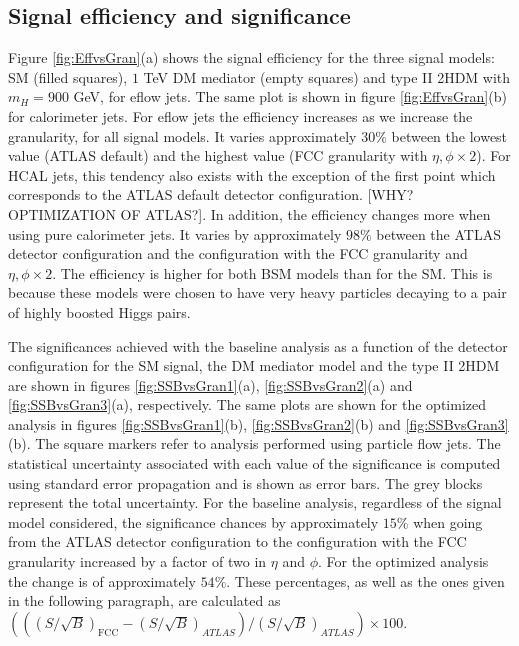\subsection{Signal efficiency and significance}
\label{sec:granstudies}

Figure \ref{fig:EffvsGran}(a) shows the signal efficiency for the three signal models: SM (filled squares), $1$ TeV DM mediator (empty squares) and type II 2HDM with $m_H=900$ GeV, for eflow jets. The same plot is shown in figure \ref{fig:EffvsGran}(b) for calorimeter jets. 
For eflow jets the efficiency increases as we increase the granularity, for all signal models. It varies approximately $30\%$ between the lowest value (ATLAS default) and the highest value (FCC granularity with $\eta,\phi\times 2$). For HCAL jets, this tendency also exists with the exception of the first point which corresponds to the ATLAS default detector configuration. [WHY? OPTIMIZATION OF ATLAS?]. In addition, the efficiency changes more when using pure calorimeter jets. It varies by approximately $98\%$ between the ATLAS detector configuration and the configuration with the FCC granularity and $\eta,\phi\times 2$.
The efficiency is higher for both BSM models than for the SM. This is because these models were chosen to have very heavy particles decaying to a pair of highly boosted Higgs pairs.

The significances achieved with the baseline analysis as a function of the detector configuration for the SM signal, the DM mediator model and the type II 2HDM are shown in figures \ref{fig:SSBvsGran1}(a), \ref{fig:SSBvsGran2}(a) and \ref{fig:SSBvsGran3}(a), respectively. The same plots are shown for the optimized analysis in figures \ref{fig:SSBvsGran1}(b), \ref{fig:SSBvsGran2}(b) and \ref{fig:SSBvsGran3}(b). The square markers refer to analysis performed using particle flow jets. The statistical uncertainty associated with each value of the significance is computed using standard error propagation and is shown as error bars. The grey blocks represent the total uncertainty.
For the baseline analysis, regardless of the signal model considered, the significance chances by approximately $15\%$ when going from the ATLAS detector configuration to the configuration with the FCC granularity increased by a factor of two in $\eta$ and $\phi$. For the optimized analysis the change is of approximately $54\%$. These percentages, as well as the ones given in the following paragraph, are calculated as $\left(((S/\sqrt{B})_{\text{FCC}}-(S/\sqrt{B})_{ATLAS})/(S/\sqrt{B})_{ATLAS}\right)\times 100$.

